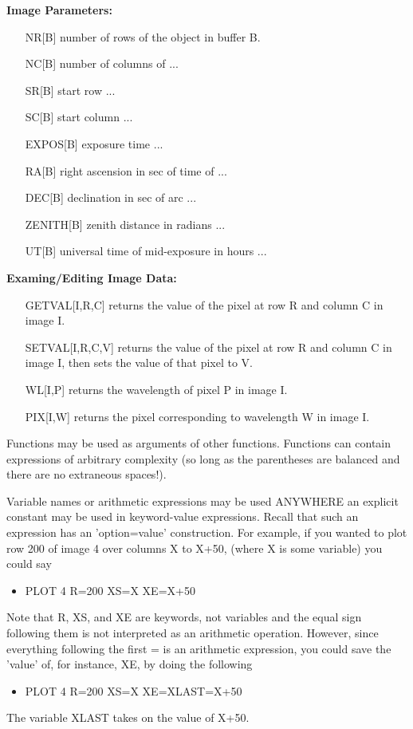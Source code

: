 \textbf{Image Parameters:}
\begin{itemize}
  \item[NR{[B]}\hfill]{number of rows of the object in buffer B.}
  \item[NC{[B]}\hfill]{number of columns of ...}
  \item[SR{[B]}\hfill]{start row ...}
  \item[SC{[B]}\hfill]{start column ...}
  \item[EXPOS{[B]}\hfill]{exposure time ...}
  \item[RA{[B]}\hfill]{right ascension in sec of time of ...}
  \item[DEC{[B]}\hfill]{declination in sec of arc ...}
  \item[ZENITH{[B]}\hfill]{zenith distance in radians ...}
  \item[UT{[B]}\hfill]{universal time of mid-exposure in hours ...}
\end{itemize}

\textbf{Examing/Editing Image Data:}
\begin{itemize}
  \item[GETVAL{[I,R,C]}\hfill]{returns the value of the pixel at row R and
       column C in image I.}
  \item[SETVAL{[I,R,C,V]}\hfill]{returns the value of the pixel at row R and
       column C in image I, then sets the value of that pixel to V.}
  \item[WL{[I,P]}\hfill]{returns the wavelength of pixel P in image I.}
  \item[PIX{[I,W]}\hfill]{returns the pixel corresponding to
       wavelength W in image I.}
\end{itemize}

Functions may be used as arguments of other functions.  Functions can
contain expressions of arbitrary complexity (so long as the parentheses are
balanced and there are no extraneous spaces!).


Variable names or arithmetic expressions may be used ANYWHERE an explicit
constant may be used in keyword-value expressions. Recall that such an
expression has an 'option=value' construction. For example, if you wanted
to plot row 200 of image 4 over columns X to X+50, (where X is some
variable) you could say
\begin{itemize}
  \item{PLOT 4 R=200 XS=X XE=X+50}
\end{itemize}
Note that R, XS, and XE are keywords, not variables and the equal sign
following them is not interpreted as an arithmetic operation.  However,
since everything following the first = is an arithmetic expression, you
could save the 'value' of, for instance, XE, by doing the following
\begin{itemize}
  \item{PLOT 4 R=200 XS=X XE=XLAST=X+50}
\end{itemize}
The variable XLAST takes on the value of X+50.


